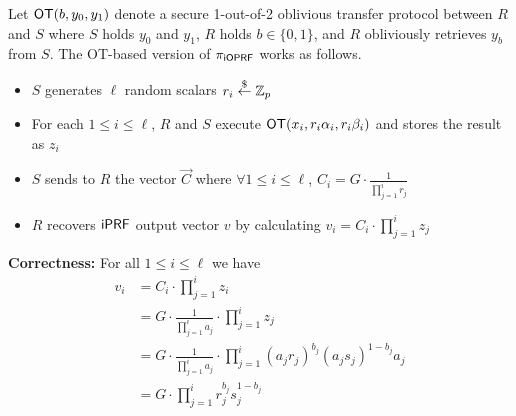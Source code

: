 Let $\mathsf{OT}(b, y_0, y_1)$ denote a secure 1-out-of-2 oblivious transfer protocol between $R$ and $S$ where
$S$ holds $y_0$ and $y_1$, $R$ holds $b\in\{0,1\}$, and $R$ obliviously retrieves $y_b$ from $S$.  The OT-based version of ${\pi_{\mathsf{i}\mathsf{OPRF}}}$ works as follows.

\begin{itemize}
\item $S$ generates $\ell$ random scalars $r_i\stackrel{\$}{\leftarrow}\mathbb{Z}_p$
\item For each $1 \leq i \leq \ell$, $R$ and $S$ execute $\mathsf{OT}(x_i, r_i\alpha_i, r_i\beta_i)$ and stores the result as $z_i$
\item $S$ sends to $R$ the vector $\vec{C}$ where $\forall 1 \leq i \leq \ell$, $C_i =  G \cdot \frac{1}{\prod_{j=1}^{i} r_j}$
\item $R$ recovers $\mathsf{i}\mathsf{PRF}$ output vector $v$ by calculating $v_i = C_i \cdot \prod_{j=1}^{i} z_j$
\end{itemize}


{\bf Correctness:}  For all $1 \leq i \leq \ell$ we have
\begin{equation}
\begin{aligned}
v_i &= C_i \cdot \prod_{j=1}^{i} z_i \\
&= G \cdot \frac{1}{\prod_{j=1}^{i} a_j} \cdot \prod_{j=1}^{i} z_j \\
&= G \cdot \frac{1}{\prod_{j=1}^{i} a_j} \cdot \prod_{j=1}^{i} (a_jr_j)^{b_j}(a_js_j)^{1-b_j} a_j \\
&= G \cdot \prod_{j=1}^{i} r_j^{b_j}s_j^{1-b_j}
\end{aligned}
\end{equation}



